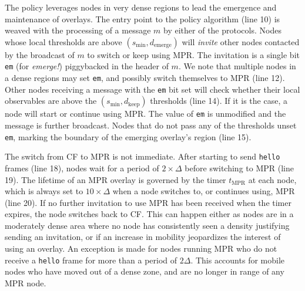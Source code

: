 

The policy leverages nodes in very dense regions to lead the emergence and maintenance of overlays.
The entry point to the policy algorithm (line 10) is weaved with the processing of a message $m$ by either of the protocols.
Nodes whose local thresholds are above $({s}_{\text{min}},{d}_{\text{emerge}})$ will \emph{invite} other nodes contacted by the broadcast of $m$ to switch or keep using MPR.
The invitation is a single bit \texttt{em} (for \emph{emerge!}) piggybacked in the header of $m$.
We note that multiple nodes in a dense regions may set \texttt{em}, and possibly switch themselves to MPR (line 12).
%
Other nodes receiving a message with the \texttt{em} bit set will check whether their local observables are above the $({s}_{\text{min}},{d}_{\text{keep}})$ thresholds (line 14).
If it is the case, a node will start or continue using MPR.
The value of \texttt{em} is unmodified and the message is further broadcast.
%
Nodes that do not pass any of the thresholds unset \texttt{em}, marking the boundary of the emerging overlay's region (line 15).

The switch from CF to MPR is not immediate.
After starting to send \texttt{hello} frames (line 18), nodes wait for a period of $2\times\Delta$ before switching to MPR (line 19).
%
The lifetime of an MPR overlay is governed by the timer $t_\text{MPR}$ at each node, which is always set to $10\times\Delta$ when a node switches to, or continues using, MPR (line 20).
If no further invitation to use MPR has been received when the timer expires, the node switches back to CF.
This can happen either as nodes are in a moderately dense area where no node has consistently seen a density justifying sending an invitation, or if an increase in mobility jeopardizes the interest of using an overlay.
An exception is made for nodes running MPR who do not receive a \texttt{hello} frame for more than a period of $2\Delta$.
This accounts for mobile nodes who have moved out of a dense zone, and are no longer in range of any MPR node.

